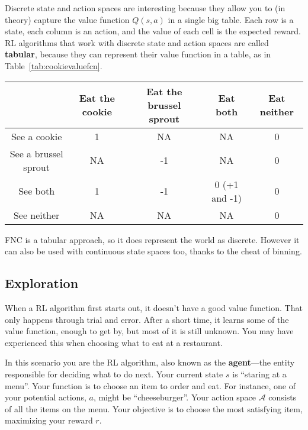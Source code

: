 Discrete state and action spaces are interesting because they allow you to
(in theory) capture the value function $Q(s, a)$ in a single big table.
Each row is a state, each column is an action, and the value of each cell
is the expected reward. RL algorithms that work with discrete state
and action spaces are called \textbf{tabular}, because they can represent
their value function in a table, as in Table~\ref{tab:cookievaluefcn}.

\begin{table*}[ht]
\centering
\begin{tabular}{c | c | c | c | c |}
& Eat the cookie & Eat the brussel sprout & Eat both & Eat neither \\
\hline
See a cookie & 1 & NA & NA & 0 \\
\hline
See a brussel sprout & NA & -1 & NA & 0 \\
\hline
See both & 1 & -1 & 0 (+1 and -1) & 0 \\
\hline
See neither & NA & NA & NA & 0 \\
\hline
\end{tabular}
\caption{Value function for the cookie/brussel sprout world}
\label{tab:cookievaluefcn}
\end{table*}


FNC is a tabular approach, so it does represent the world as discrete.
However it can also be used with continuous state spaces too, thanks
to the cheat of binning.

\subsection{Exploration}
\label{subsec:introexploration}

When a RL algorithm first starts out, it doesn't have a good value function.
That only happens through trial and error. After a short time, it learns
some of the value function, enough to get by, but most of it is still unknown.
You may have experienced this when choosing what to eat at a restaurant.

In this scenario you are the RL algorithm, also known as the
\textbf{agent}---the entity responsible for deciding what to do next.
Your current state $s$ is “staring at a menu”. Your function is to
choose an item to order and eat. For instance, one of your potential
actions, $a$, might be “cheeseburger”. Your action space $\mathcal{A}$
consists of all the items on the menu. Your objective is to choose the most
satisfying item, maximizing your reward $r$.

